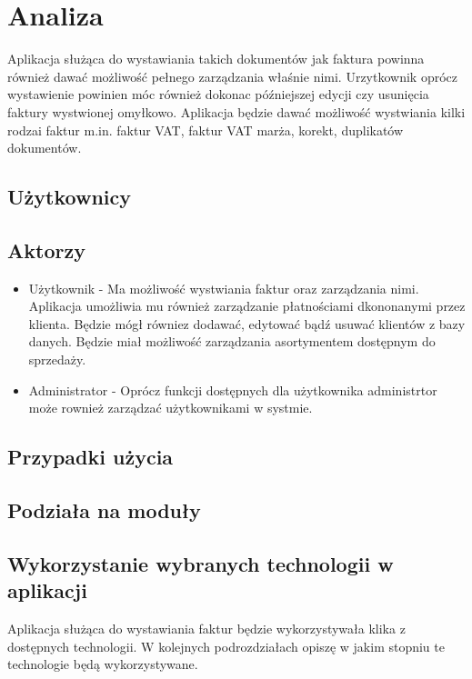 \section{Analiza}
Aplikacja służąca do wystawiania takich dokumentów jak faktura powinna również dawać możliwość 
pełnego zarządzania właśnie nimi. Urzytkownik oprócz wystawienie powinien móc również dokonac późniejszej
edycji czy usunięcia faktury wystwionej omyłkowo. Aplikacja będzie dawać możliwość wystwiania kilki rodzai
faktur m.in. faktur VAT, faktur VAT marża, korekt, duplikatów dokumentów.
\subsection{Użytkownicy}

\subsection{Aktorzy}
\begin{itemize}
  \item Użytkownik - Ma możliwość wystwiania faktur oraz zarządzania nimi. Aplikacja umożliwia mu również
  zarządzanie płatnościami dkononanymi przez klienta. Będzie mógł równiez dodawać, edytować bądź usuwać 
  klientów z bazy danych. Będzie miał możliwość zarządzania asortymentem dostępnym do sprzedaży. 
  \item Administrator - Oprócz funkcji dostępnych dla użytkownika administrtor może rownież zarządzać
  użytkownikami w systmie.
\end{itemize}
\subsection{Przypadki użycia}
\subsection{Podziała na moduły}
\subsection{Wykorzystanie wybranych technologii w aplikacji}
Aplikacja służąca do wystawiania faktur będzie wykorzystywała klika z dostępnych technologii.
W kolejnych podrozdziałach opiszę w jakim stopniu te technologie będą wykorzystywane.
